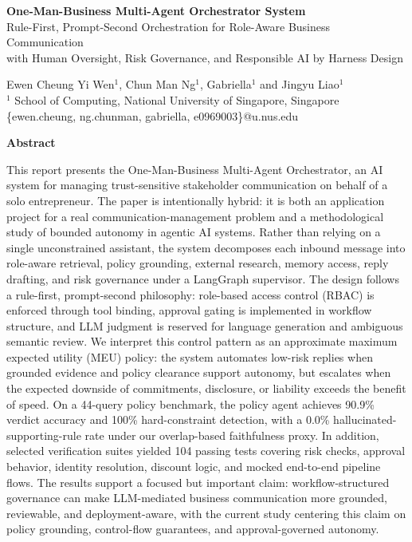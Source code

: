 \documentclass[11pt]{article}
\begin{document}
\singlespacing
\begin{center}
{\LARGE \textbf{One-Man-Business Multi-Agent Orchestrator System}}\\[0.5em]

{\normalsize Rule-First, Prompt-Second Orchestration for Role-Aware Business Communication}\\
{\normalsize with Human Oversight, Risk Governance, and Responsible AI by Harness Design}

\vspace{1em}

Ewen Cheung Yi Wen$^{1}$, Chun Man Ng$^{1}$, Gabriella$^{1}$ and Jingyu Liao$^{1}$\\
{\small $^{1}$ School of Computing, National University of Singapore, Singapore}\\
{\small \{ewen.cheung, ng.chunman, gabriella, e0969003\}@u.nus.edu}
\end{center}

\vspace{1.5em}

\begin{center}
\textbf{Abstract}
\end{center}


\noindent
This report presents the One-Man-Business Multi-Agent Orchestrator, an AI system for managing trust-sensitive stakeholder communication on behalf of a solo entrepreneur. The paper is intentionally hybrid: it is both an application project for a real communication-management problem and a methodological study of bounded autonomy in agentic AI systems. Rather than relying on a single unconstrained assistant, the system decomposes each inbound message into role-aware retrieval, policy grounding, external research, memory access, reply drafting, and risk governance under a LangGraph supervisor. The design follows a rule-first, prompt-second philosophy: role-based access control (RBAC) is enforced through tool binding, approval gating is implemented in workflow structure, and LLM judgment is reserved for language generation and ambiguous semantic review. We interpret this control pattern as an approximate maximum expected utility (MEU) policy: the system automates low-risk replies when grounded evidence and policy clearance support autonomy, but escalates when the expected downside of commitments, disclosure, or liability exceeds the benefit of speed. On a 44-query policy benchmark, the policy agent achieves 90.9\% verdict accuracy and 100\% hard-constraint detection, with a 0.0\% hallucinated-supporting-rule rate under our overlap-based faithfulness proxy. In addition, selected verification suites yielded 104 passing tests covering risk checks, approval behavior, identity resolution, discount logic, and mocked end-to-end pipeline flows. The results support a focused but important claim: workflow-structured governance can make LLM-mediated business communication more grounded, reviewable, and deployment-aware, with the current study centering this claim on policy grounding, control-flow guarantees, and approval-governed autonomy.
\end{document}

